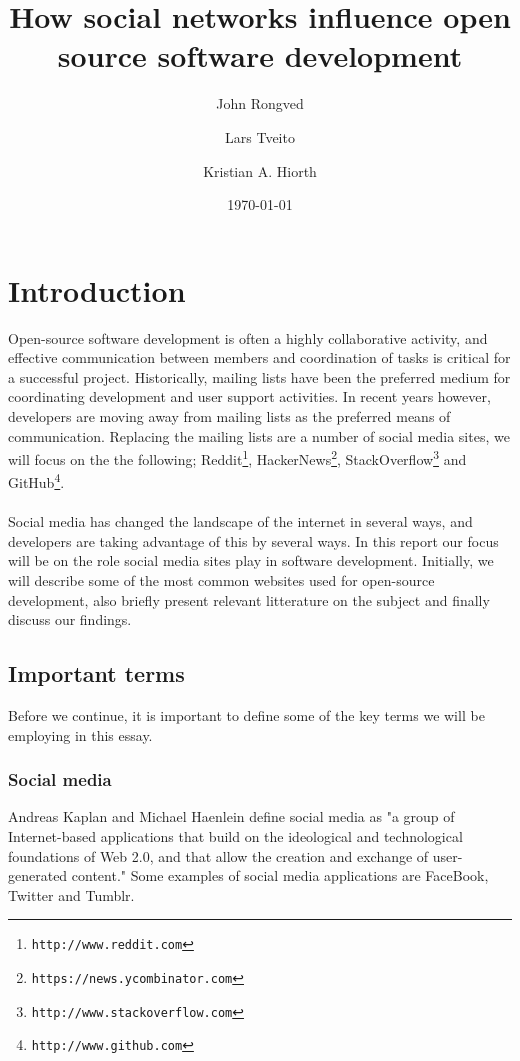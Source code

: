 \documentclass[a4paper,11pt]{article} %
\title{How social networks influence open source software development}
\date{\today}
\author{John Rongved \and Lars Tveito \and Kristian A. Hiorth}
\begin{document}
\ififorside{}

\tableofcontents{}
\newpage
\section{Introduction}

Open-source software development is often a highly collaborative activity, and effective communication 
between members and coordination of tasks is critical for a successful project. 
Historically, mailing lists have been the preferred medium for coordinating development
and user support activities\cite{Vasilescu14StackOverflow}. In recent years however, 
developers are moving away from mailing lists as the preferred means of communication.
Replacing the mailing lists are a number of social media sites, we will focus on the the following;
Reddit\footnote{\texttt{http://www.reddit.com}}, HackerNews\footnote{\texttt{https://news.ycombinator.com}},
StackOverflow\footnote{\texttt{http://www.stackoverflow.com}} and GitHub\footnote{\texttt{http://www.github.com}}.
\\\\Social media has changed the landscape of the internet in several ways, and developers are taking advantage of this by several ways. In this report our focus will be on the role social
media sites play in software development. Initially, we will describe some of the most common
websites used for open-source development, also briefly present relevant 
litterature on the subject and finally discuss our findings.

\subsection{Important terms}
Before we continue, it is important to define some of the key terms we will be employing
in this essay. 
\subsubsection{Social media}
Andreas Kaplan and Michael Haenlein define social media as "a group of Internet-based applications that build on the ideological and technological foundations of Web 2.0, and that allow the creation and exchange of user-generated content."\cite{Kaplan201059} Some examples of social media applications are FaceBook, Twitter and Tumblr.
\end{document}
